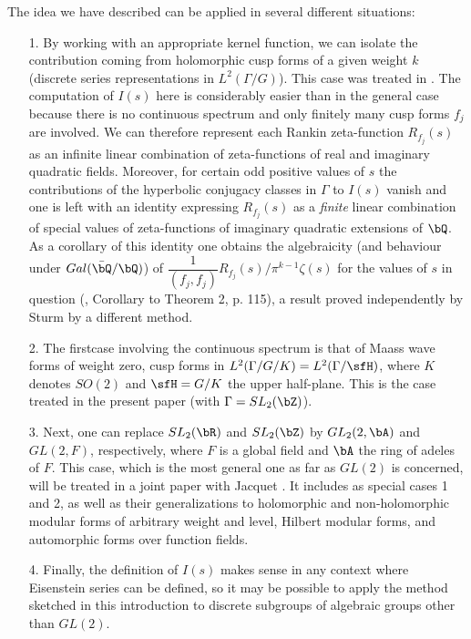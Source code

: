 The idea we have described can be applied in several different situations:
\begin{itemize}
\item[1.] By working with an appropriate kernel function, we can isolate the contribution coming from holomorphic cusp forms of a given weight $k$ (discrete series representations in $L^2 (\Gamma / G)$). This case was treated in \cite{art11-10}. The computation of $I(s)$ here is considerably easier than in the general case because there is no continuous spectrum and only finitely many cusp forms $f_j$ are involved. We can therefore represent each Rankin zeta-function $R_{f_j}(s)$ as an infinite linear combination of zeta-functions of real and imaginary quadratic fields. Moreover, for certain odd positive values of $s$ the contributions of the hyperbolic conjugacy classes in $\Gamma$ to $I(s)$ vanish and one is left with an identity expressing $R_{f_j}(s)$ as a \textit{finite} linear combination of special values of zeta-functions of imaginary quadratic extensions of $\bQ$. As a corollary of this identity one obtains the algebraicity (and behaviour under $Gal (\bar{\bQ}/\bQ)$) of $\dfrac{1}{(f_j, f_j)}R_{f_j} (s)/ \pi^{k-1} \zeta(s)$ for the values of $s$ in question (\cite{art11-10}, Corollary to Theorem 2, p. 115), a result proved independently by Sturm \cite{art11-9} by a different method.

\item[2.] The first\pageoriginale case involving the continuous spectrum is that of Maass wave forms of weight zero, \ie cusp forms in $L^2 (\Gamma / G / K) = L^2 (\Gamma / \sfH)$, where $K$ denotes $SO(2)$ and $\sfH = G/ K$ the upper half-plane. This is the case treated in the present paper (with $\Gamma = SL_2 (\bZ)$).
 
\item[3.] Next, one can replace $SL_2 (\bR)$ and $SL_2 (\bZ)$ by $GL_2 (2, \bA)$ and $GL (2, F)$, respectively, where $F$ is a global field and $\bA$ the ring of adeles of $F$. This case, which is the most general one as far as $GL(2)$ is concerned, will be treated in a joint paper with Jacquet \cite{art11-3}. It includes as special cases 1 and 2, as well as their generalizations to holomorphic and non-holomorphic modular forms of arbitrary weight and level, Hilbert modular  forms, and automorphic forms over function fields.
 
\item[4.] Finally, the definition of $I(s)$ makes sense in any context where Eisenstein series can be defined, so it may be possible to apply the method sketched in this introduction to discrete subgroups of algebraic groups other than $GL(2)$.
\end{itemize}

